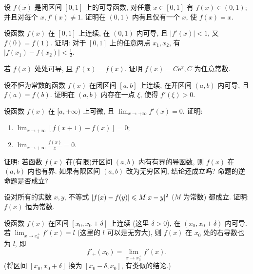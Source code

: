 \begin{exercise}[3.3.6]
    设 $f(x)$ 是闭区间 $[0,1]$ 上的可导函数, 对任意 $x \in [0,1]$ 有 $f(x) \in (0,1)$; 并且对每个 $x, f'(x) \ne 1$. 证明在 $(0,1)$ 内有且仅有一个 $x$, 使 $f(x)=x$.
\end{exercise}

\begin{exercise}[3.3.7]
    设函数 $f(x)$ 在 $[0,1]$ 上连续, 在 $(0,1)$ 内可导, 且 $|f'(x)| < 1$, 又 $f(0)=f(1)$. 证明: 对于 $[0,1]$ 上的任意两点 $x_1, x_2$, 有 $|f(x_1)-f(x_2)| < \frac{1}{2}$.
\end{exercise}

\begin{exercise}[3.3.8]
    若 $f(x)$ 处处可导, 且 $f'(x)=f(x)$. 证明 $f(x) = C\mathrm{e}^x, C$ 为任意常数.
\end{exercise}

\begin{exercise}[3.3.9]
    设不恒为常数的函数 $f(x)$ 在闭区间 $[a,b]$ 上连续, 在开区间 $(a,b)$ 内可导, 且 $f(a)=f(b)$. 证明在 $(a,b)$ 内存在一点 $\xi$, 使得 $f'(\xi)>0$.
\end{exercise}

\begin{exercise}[3.3.10]
    设函数 $f(x)$ 在 $[a, +\infty)$ 上可微, 且 $\lim_{x \to +\infty} f'(x) = 0$. 证明:
    \begin{enumerate}
        \item $\lim_{x \to +\infty} [f(x+1)-f(x)] = 0$;
        \item $\lim_{x \to +\infty} \frac{f(x)}{x} = 0$.
    \end{enumerate}
\end{exercise}

\begin{exercise}[3.3.11]
    证明: 若函数 $f(x)$ 在(有限)开区间 $(a,b)$ 内有有界的导函数, 则 $f(x)$ 在 $(a,b)$ 内也有界. 如果有限区间 $(a,b)$ 改为无穷区间, 结论还成立吗? 命题的逆命题是否成立?
\end{exercise}

\begin{exercise}[3.3.12]
    设对所有的实数 $x,y$, 不等式 $|f(x)-f(y)| \leqslant M|x-y|^2$ ($M$ 为常数) 都成立. 证明: $f(x)$ 恒为常数.
\end{exercise}

\begin{exercise}[3.3.13]
    设函数 $f(x)$ 在区间 $[x_0, x_0+\delta]$ 上连续 (这里 $\delta>0$), 在 $(x_0, x_0+\delta)$ 内可导. 若 $\lim_{x \to x_0^+} f'(x) = l$ (这里的 $l$ 可以是无穷大), 则 $f(x)$ 在 $x_0$ 处的右导数也为 $l$, 即
    $$ f'_+(x_0) = \lim_{x \to x_0^+} f'(x). $$
    (将区间 $[x_0, x_0+\delta]$ 换为 $[x_0-\delta, x_0]$, 有类似的结论.)
\end{exercise}

